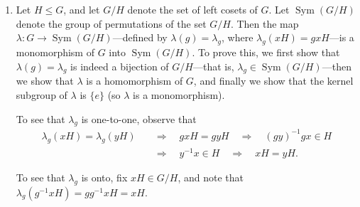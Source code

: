 \documentclass[12pt,reqno]{amsart}
\newcommand{\Z}{\ensuremath{\mathbb{Z}}}
\newcommand{\<}{\ensuremath{\langle}}
\renewcommand{\>}{\ensuremath{\rangle}}
\newcommand{\Sym}{\ensuremath{\operatorname{Sym}}}
\begin{document}
\begin{enumerate}
\begin{enumerate}
      {\it Proof 2:} 
      If $G$ were not a subgroup of $A_n$, then the group
      $G A_n\leq S_n$ would have order larger than $|A_n| = |S_n|/2$. 
      By Lagrange's theorem, then, it would have order
      $|S_n|$.  Therefore, $G A_n = S_n$, and, by the 
      second isomorphism theorem,
      \[
      G/(G\cap A_n) \cong G A_n/A_n = S_n/A_n.
      \]
      This rules out $G\cap A_n = (e)$, since that would give $G \cong S_n/A_n
      \cong \Z_2$ (abelian), contradicting the hypothesis.
      \qed
      ~\\
      {\bf Remark:}  Although the first proof above is completely elementary, the second is worth
      noting since it reveals useful information even when we don't assume $G$ is
      simple and nonabelian.  For example, if $G$ is a subgroup of $S_n$
      containing an odd permutation, then we can show that exactly half of the
      elements of $G$ are even and half are odd.  Indeed, under these conditions 
      we have $G A_n = S_n$ (as in the second proof above), and then the second isomorphism
      theorem implies $|G/(G\cap A_n)| =|S_n/A_n|=2$. Therefore, $|G\cap A_n| =|G|/2$,
      which says that half the elements of $G$ belong to $A_n$, as claimed. 

      \medskip
    \item
      Let $H\leq G$, and let $G/H$ denote the set of left cosets of $G$.  Let
      $\Sym(G/H)$ denote the group of permutations of the set $G/H$.  Then the map 
      $\lambda: G\rightarrow  \Sym(G/H)$---defined by 
      $\lambda(g) = \lambda_g$, where $\lambda_g(xH) = gxH$---is a 
      monomorphism of $G$ into $\Sym(G/H)$.  To prove this, we first show that 
      $\lambda(g) = \lambda_g$ is indeed a bijection of $G/H$---that is,
      $\lambda_g \in \Sym(G/H)$---then we show that 
      $\lambda$ is a homomorphism of $G$, and finally we show that the kernel
      subgroup of $\lambda$ is $\{e\}$ (so $\lambda$ is a monomorphism).

      To see that $\lambda_g$ is one-to-one, observe that
      \begin{align*}
      \lambda_g(xH) = \lambda_g(yH) 
      \quad &\Longrightarrow \quad 
      gxH = gyH
      \quad \Longrightarrow \quad 
      (gy)^{-1}gx \in H\\
      \quad &\Longrightarrow \quad 
      y^{-1}x \in H
      \quad \Longrightarrow \quad 
      xH = yH.
      \end{align*}


      To see that $\lambda_g$ is onto, fix $xH\in G/H$, and note that
      $\lambda_g(g^{-1}xH) = gg^{-1}xH = xH$.


\end{enumerate}
\end{enumerate}
\end{document}
